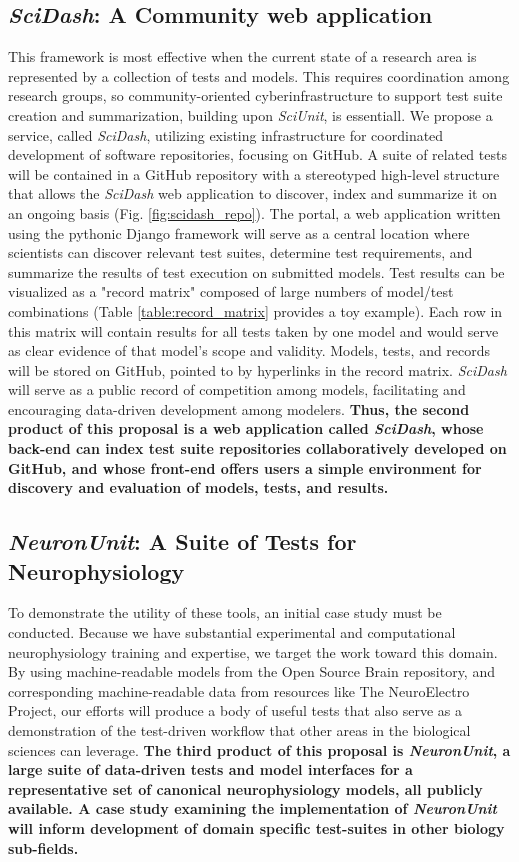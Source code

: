 \documentclass[11pt,letterpaper]{article}
\begin{document}
\subsection{\textit{SciDash}: A Community web application}\label{sec:scidash}
This framework is most effective when the current state of a research area is represented by a collection of tests and models. This requires coordination among research groups, so community-oriented cyberinfrastructure to support test suite creation and summarization, building upon \textit{SciUnit}, is essentiall. We propose a service, called \textit{SciDash}, utilizing existing infrastructure for coordinated development of software repositories, focusing on GitHub\cite{github_url}\cite{ram_git_2013}. A suite of related tests will be contained in a GitHub repository with a stereotyped high-level structure that allows the \textit{SciDash} web application to discover, index and summarize it on an ongoing basis (Fig. \ref{fig:scidash_repo}). The portal, a web application written using the pythonic Django framework\cite{django_url} will serve as a central location where scientists can discover relevant test suites, determine test requirements, and summarize the results of test execution on submitted models. Test results can be visualized as a "record matrix" composed of large numbers of model/test combinations (Table \ref{table:record_matrix} provides a toy example).  Each row in this matrix will contain results for all tests taken by one model and would serve as clear evidence of that model's scope and validity.  Models, tests, and records will be stored on GitHub, pointed to by hyperlinks in the record matrix. \textit{SciDash} will serve as a public record of competition among models, facilitating and encouraging data-driven development among modelers. \textbf{Thus, the second product of this proposal is a web application called \textit{SciDash}, whose back-end can index test suite repositories collaboratively developed on GitHub, and whose front-end offers users a simple environment for discovery and evaluation of models, tests, and results.}  

\subsection{\textit{NeuronUnit}: A Suite of Tests for Neurophysiology}\label{sec:neuronunit}
To demonstrate the utility of these tools, an initial case study must be conducted. Because we have substantial experimental and computational neurophysiology training and expertise, we target the work toward this domain. By using machine-readable models from the Open Source Brain repository, and corresponding machine-readable data from resources like The NeuroElectro Project\cite{neuroelectro_url}, our efforts will produce a body of useful tests that also serve as a demonstration of the test-driven workflow that other areas in the biological sciences can leverage.  \textbf{The third product of this proposal is \textit{NeuronUnit}, a large suite of data-driven tests and model interfaces for a representative set of canonical neurophysiology models, all publicly available. A case study examining the implementation of \textit{NeuronUnit} will inform development of domain specific test-suites in other biology sub-fields.}
\end{document}
